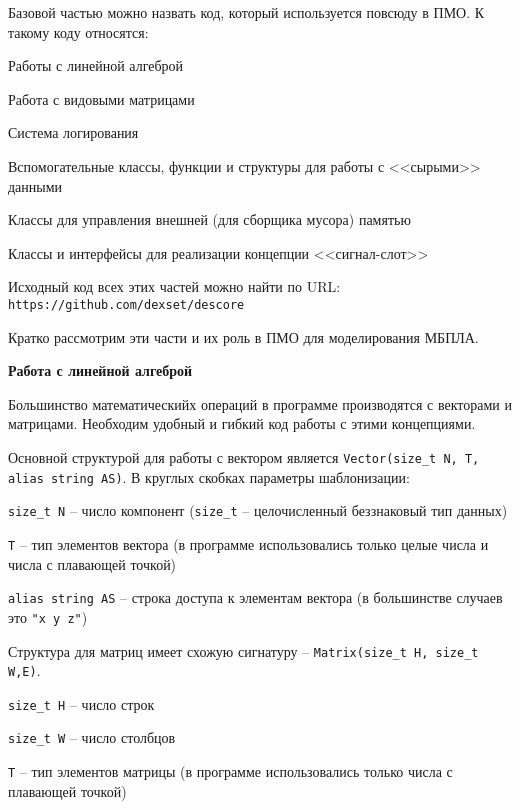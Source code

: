 Базовой частью можно назвать код, который используется повсюду в ПМО.
К такому коду относятся:

\begin{mintemize}
\item Работы с линейной алгеброй
\item Работа с видовыми матрицами
\item Система логирования
\item Вспомогательные классы, функции и структуры для работы с
    <<сырыми>> данными
\item Классы для управления внешней (для сборщика мусора) памятью
\item Классы и интерфейсы для реализации концепции <<сигнал-слот>>
\end{mintemize}

Исходный код всех этих частей можно найти по
\linebreak URL: \verb|https://github.com/dexset/descore|

Кратко рассмотрим эти части и их роль в ПМО для моделирования МБПЛА.

\textbf{Работа с линейной алгеброй}

Большинство математическийх операций в программе производятся с векторами и матрицами.
Необходим удобный и гибкий код работы с этими концепциями.

Основной структурой для работы с вектором является \linebreak
\verb|Vector(size_t N, T, alias string AS)|. В круглых скобках параметры шаблонизации:

\begin{mintemize}
\item \verb|size_t N| -- число компонент (\verb|size_t| -- целочисленный беззнаковый тип данных)
\item \verb|T| -- тип элементов вектора (в программе использовались только целые числа и числа с плавающей точкой)
\item \verb|alias string AS| -- строка доступа к элементам вектора (в большинстве случаев это \verb|"x y z"|)
\end{mintemize}

Структура для матриц имеет схожую сигнатуру -- \verb|Matrix(size_t H, size_t W,E)|.

\begin{mintemize}
\item \verb|size_t H| -- число строк
\item \verb|size_t W| -- число столбцов
\item \verb|T| -- тип элементов матрицы (в программе использовались только числа с плавающей точкой)
\end{mintemize}

